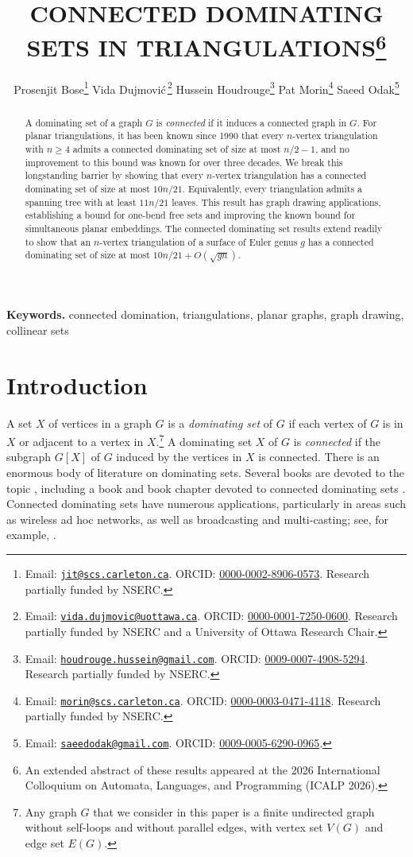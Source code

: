 \documentclass{patmorin}
\title{\MakeUppercase{Connected Dominating Sets in Triangulations}\thanks{An extended abstract of these results appeared at the 2026 International Colloquium on Automata, Languages, and Programming (ICALP 2026).}}
\author{Prosenjit Bose\thanks{Email: \href{mailto:jit@scs.carleton.ca}{\texttt{jit@scs.carleton.ca}}. ORCID: \href{https://orcid.org/0000-0002-8906-0573}{0000-0002-8906-0573}. Research partially funded by NSERC.} \quad
Vida Dujmovi\'c\,\thanks{Email: \href{mailto:vida.dujmovic@uottawa.ca}{\texttt{vida.dujmovic@uottawa.ca}}. ORCID: \href{https://orcid.org/0000-0001-7250-0600}{0000-0001-7250-0600}. Research partially funded by NSERC and a University of Ottawa Research Chair.} \quad
Hussein Houdrouge\thanks{Email: \href{mailto:houdrouge.hussein@gmail.com}{\texttt{houdrouge.hussein@gmail.com}}. ORCID: \href{https://orcid.org/0009-0007-4908-5294}{0009-0007-4908-5294}. Research partially funded by NSERC.} \quad
Pat Morin\thanks{Email: \href{mailto:morin@scs.carleton.ca}{\texttt{morin@scs.carleton.ca}}. ORCID: \href{https://orcid.org/0000-0003-0471-4118}{0000-0003-0471-4118}. Research partially funded by NSERC.} \quad
Saeed Odak\thanks{Email: \href{mailto:saeedodak@gmail.com}{\texttt{saeedodak@gmail.com}}. ORCID: \href{https://orcid.org/0009-0005-6290-0965}{0009-0005-6290-0965}.}}
\date{}
\newcommand{\defin}[1]{\emph{\textcolor{brightmaroon}{#1}}}
\begin{document}
\maketitle

\begin{abstract}
A dominating set of a graph $G$ is \emph{connected} if it induces a connected graph in $G$. For planar triangulations, it has been known since 1990 that every $n$-vertex triangulation with $n\ge4$ admits a connected dominating set of size at most $n/2 - 1$, and no improvement to this bound was known for over three decades. We break this longstanding barrier by showing that every $n$-vertex triangulation has a connected dominating set of size at most $10n/21$. Equivalently, every triangulation admits a spanning tree with at least $11n/21$ leaves. 
This result has graph drawing applications, establishing a bound for one-bend free sets and improving the known bound for simultaneous planar embeddings. 
The connected dominating set results extend readily to show that an $n$-vertex triangulation of a surface of Euler genus $g$ has a connected dominating set of size at most $10n/21+O(\sqrt{gn})$.
\end{abstract}

{\small
\noindent\textbf{Keywords.} connected domination, triangulations, planar graphs, graph drawing, collinear sets
\par\smallskip
\par}
\medskip


\section{Introduction}
A set $X$ of vertices in a graph $G$ is a \defin{dominating set} of $G$ if each vertex of $G$ is in $X$ or adjacent to a vertex in $X$.\footnote{Any graph $G$ that we consider in this paper is a finite undirected graph without self-loops and without parallel edges, with vertex set $V(G)$ and edge set $E(G)$.}  A dominating set $X$ of $G$ is \defin{connected} if the subgraph $G[X]$ of $G$ induced by the vertices in $X$ is connected.  There is an enormous body of literature on dominating sets. Several books are devoted to the topic \cite{haynes.hedetniemi.ea:domination,haynes.hedetniemi.ea:topics,du.wan:connected,haynes.hedetniemi.ea:vol2}, including a book and book chapter devoted to connected dominating sets \cite{du.wan:connected,chellali.favaron:connected}. Connected dominating sets have numerous applications, particularly in areas such as wireless ad hoc networks, as well as broadcasting and multi-casting; see, for example, \cite{wu:dominating}.
\end{document}
